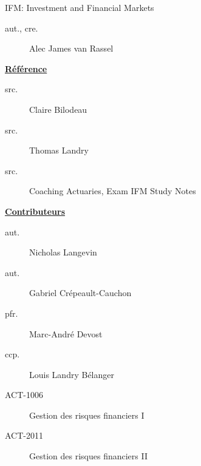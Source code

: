 \begin{contrib}{IFM: Investment and Financial Markets}
\begin{description}
	\item[aut., cre.] Alec James van Rassel
\end{description}

\textbf{\underline{Référence}}
\begin{description}
	\item[src.] Claire Bilodeau
	\item[src.] Thomas Landry	
	\item[src.]	Coaching Actuaries, Exam IFM Study Notes
\end{description}

\textbf{\underline{Contributeurs}}
\begin{description}
	\item[aut.] Nicholas Langevin
	\item[aut.] Gabriel Crépeault-Cauchon 
	\item[pfr.]	Marc-André Devost
	\item[ccp.]	Louis Landry Bélanger
\end{description}
\end{contrib}

\begin{distributions}
\begin{description}
	\item[ACT-1006]	Gestion des risques financiers I
	\item[ACT-2011]	Gestion des risques financiers II
\end{description}
\end{distributions}